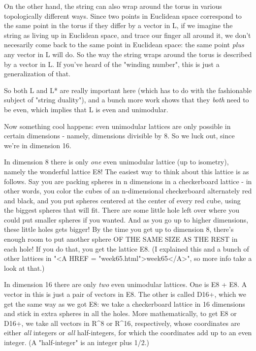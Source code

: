 On the other hand, the string can also wrap around the torus in 
various topologically different ways.  Since two points in Euclidean 
space correspond to the same point in the torus if they differ by a 
vector in L, if we imagine the string as living up in Euclidean space,
and trace our finger all around it, we don't necesarily come back to 
the same point in Euclidean space: the same point \emph{plus} any vector
in L will do.  So the way the string wraps around the torus is 
described by a vector in L.  If you've heard of the "winding number",
this is just a generalization of that.  

So both L and L* are really important here (which has to do with
the fashionable subject of "string duality"), and a bunch 
more work shows that they \emph{both} need to be even, which implies 
that L is even and unimodular.

Now something cool happens: even unimodular lattices are only 
possible in certain dimensions - namely, dimensions divisible by 8.  
So we luck out, since we're in dimension 16.  

In dimension 8 there is only \emph{one} even unimodular lattice (up to 
isometry), namely the wonderful lattice E8!   The easiest way to think 
about this lattice is as follows.  Say you are packing spheres in n 
dimensions in a checkerboard lattice - in other words, you color
the cubes of an n-dimensional checkerboard alternately red and black,
and you put spheres centered at the center of every red cube, using
the biggest spheres that will fit.  There are some little hole left 
over where you could put smaller spheres if you wanted.  And as you 
go up to higher dimensions, these little holes gets bigger!  By the 
time you get up to dimension 8, there's enough room to put another 
sphere OF THE SAME SIZE AS THE REST in each hole!   If you do that, 
you get the lattice E8.  (I explained this and a bunch of other 
lattices in "<A HREF = "week65.html">week65</A>", so more info take a look at that.)


In dimension 16 there are only \emph{two} even unimodular lattices.
One is E8 + E8.  A vector in this is just a pair of vectors in E8.  The
other is called D16+, which we get the same way as we got E8: we take a
checkerboard lattice in 16 dimensions and stick in extra spheres in all
the holes.  More mathematically, to get E8 or D16+, we take all vectors
in R^{8} or R^{16}, respectively, whose coordinates are
either \emph{all} integers or \emph{all} half-integers, for which
the coordinates add up to an even integer.  (A "half-integer"
is an integer plus 1/2.)

